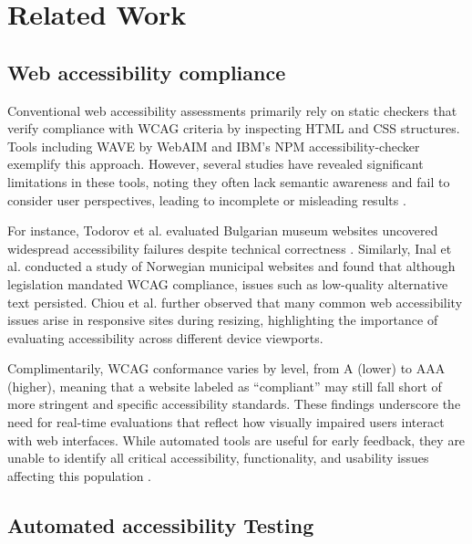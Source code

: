 
\section{Related Work}
\subsection{Web accessibility compliance}

Conventional web accessibility assessments primarily rely on static checkers that verify compliance with \ac{WCAG} criteria by inspecting HTML and CSS structures. Tools including WAVE by WebAIM\cite{webaim_wave_2025} and IBM's NPM accessibility-checker\cite{ibm_accessibility_checker_2025} exemplify this approach. However, several studies have revealed significant limitations in these tools, noting they often lack semantic awareness and fail to consider user perspectives, leading to incomplete or misleading results \cite{ara2024inclusive}. 

For instance, Todorov et al. evaluated Bulgarian museum websites uncovered widespread accessibility failures despite technical correctness \cite{todorov2022accessibility}. Similarly, Inal et al. conducted a study of Norwegian municipal websites and found that although legislation mandated \ac{WCAG} compliance, issues such as low-quality alternative text persisted.
Chiou et al. further observed that many common web accessibility issues arise in responsive sites during resizing, highlighting the importance of evaluating accessibility across different device viewports\cite{chiou2024automatically}.

Complimentarily, \ac{WCAG} conformance varies by level, from A (lower) to AAA (higher), meaning that a website labeled as “compliant” may still fall short of more stringent and specific accessibility standards. These findings underscore the need for real-time evaluations that reflect how visually impaired users interact with web interfaces. 
While automated tools are useful for early feedback, they are unable to identify all critical accessibility, functionality, and usability issues affecting this population \cite{todorov2022accessibility}.

\subsection{Automated accessibility Testing}

